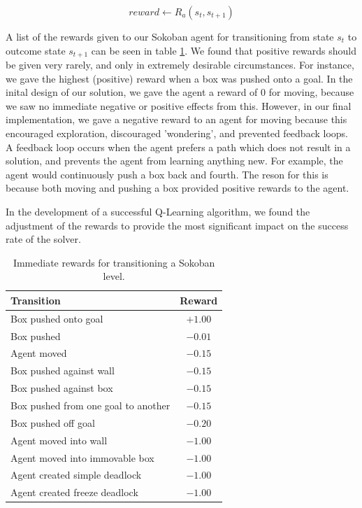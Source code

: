\documentclass[times, 10pt,twocolumn]{article}
\begin{document}
\begin{equation}
reward \gets R_a(s_t, s_{t+1})
\label{eq:reward}
\end{equation}

A list of the rewards given to our Sokoban agent for transitioning from state $s_t$ to outcome state $s_{t+1}$ can be seen in table \ref{table:rewards}.  We found that positive rewards should be given very rarely, and only in extremely desirable circumstances.  For instance, we gave the highest (positive) reward when a box was pushed onto a goal.  In the inital design of our solution, we gave the agent a reward of 0 for moving, because we saw no immediate negative or positive effects from this.  However, in our final implementation, we gave a negative reward to an agent for moving because this encouraged exploration, discouraged 'wondering', and prevented feedback loops.  A feedback loop occurs when the agent prefers a path which does not result in a solution, and prevents the agent from learning anything new.  For example, the agent would continuously push a box back and fourth. The reson for this is because both moving and pushing a box provided positive rewards to the agent. 

In the development of a successful Q-Learning algorithm, we found the adjustment of the rewards to provide the most significant impact on the success rate of the solver.

\begin{table}[htbp]
  \centering
  \begin{tabular}{l c} \hline\hline
    Transition & Reward \\ \hline
    Box pushed onto goal & $+1.00$ \\
    Box pushed & $-0.01$ \\
    Agent moved & $-0.15$ \\
    Box pushed against wall & $-0.15$ \\
    Box pushed against box & $-0.15$ \\
    Box pushed from one goal to another & $-0.15$ \\
    Box pushed off goal & $-0.20$ \\ 
    Agent moved into wall & $-1.00$ \\
    Agent moved into immovable box & $-1.00$ \\
    Agent created simple deadlock & $-1.00$ \\
    Agent created freeze deadlock & $-1.00$ \\ \hline\hline
  \end{tabular}
  \caption{Immediate rewards for transitioning a Sokoban level.}
  \label{table:rewards}
\end{table}
\end{document}
